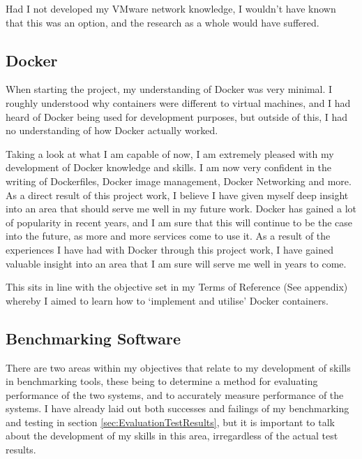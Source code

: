 Had I not developed my VMware network knowledge, I wouldn't have known that this was an option, and the research as a whole would have suffered.

\subsection{Docker}%
When starting the project, my understanding of Docker was very minimal. I roughly understood why containers were different to virtual machines, and I had heard of Docker being used for development purposes, but outside of this, I had no understanding of how Docker actually worked.

Taking a look at what I am capable of now, I am extremely pleased with my development of Docker knowledge and skills. I am now very confident in the writing of Dockerfiles, Docker image management, Docker Networking and more. As a direct result of this project work, I believe I have given myself deep insight into an area that should serve me well in my future work. Docker has gained a lot of popularity in recent years, and I am sure that this will continue to be the case into the future, as more and more services come to use it. As a result of the experiences I have had with Docker through this project work, I have gained valuable insight into an area that I am sure will serve me well in years to come.

This sits in line with the objective set in my Terms of Reference (See appendix) whereby I aimed to learn how to `implement and utilise' Docker containers.

\subsection{Benchmarking Software}
There are two areas within my objectives that relate to my development of skills in benchmarking tools, these being to determine a method for evaluating performance of the two systems, and to accurately measure performance of the systems. I have already laid out both successes and failings of my benchmarking and testing in section \ref{sec:EvaluationTestResults}, but it is important to talk about the development of my skills in this area, irregardless of the actual test results.

